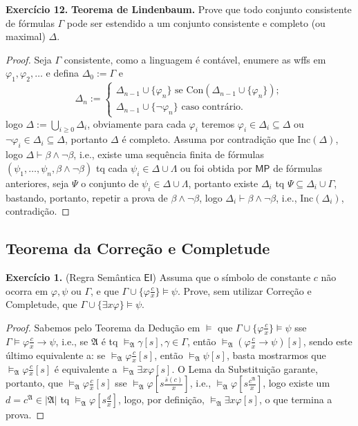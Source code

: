 \documentclass[11pt]{article}
\newcommand{\mf}[1]{\mathfrak{#1}}
\newcommand{\msf}[1]{\mathsf{#1}}
\newcommand{\subs}[2]{
    \setcounter{subsection}{#1 - 1}
    \subsection{#2}
    }
\begin{document}
\begin{shaded}
\textbf{Exercício 12.} \textbf{Teorema de Lindenbaum.} Prove que todo conjunto consistente de fórmulas $\Gamma$ pode ser estendido a um conjunto consistente e completo (ou maximal) $\Delta$. 
\end{shaded}

\begin{proof}
    Seja $\Gamma$ consistente, como a linguagem é contável, enumere as wffs em $\varphi_1,\varphi_2,\dots$ e defina $\Delta_0:=\Gamma$ e
    $$\Delta_n:=\begin{cases}
        \Delta_{n-1}\cup\{\varphi_n\}\text{ se }\text{Con}(\Delta_{n-1}\cup\{\varphi_n\});\\
        \Delta_{n-1}\cup\{\neg\varphi_n\}\text{ caso contrário.}
    \end{cases}$$
    logo $\Delta:=\bigcup_{i\geq0}\Delta_i$, obviamente para cada $\varphi_i$ teremos $\varphi_i\in\Delta_i\subseteq\Delta$ ou $\neg\varphi_i\in\Delta_i\subseteq\Delta$, portanto $\Delta$ é completo. Assuma por contradição que $\text{Inc}(\Delta)$, logo $\Delta\vdash\beta\wedge\neg\beta$, i.e., existe uma sequência finita de fórmulas $(\psi_1,\dots,\psi_n,\beta\wedge\neg\beta)$ tq cada $\psi_i\in\Delta\cup\Lambda$ ou foi obtida por $\msf{MP}$ de fórmulas anteriores, seja $\Psi$ o conjunto de $\psi_i\in\Delta\cup\Lambda$, portanto existe $\Delta_i$ tq $\Psi\subseteq\Delta_i\cup\Gamma$, bastando, portanto, repetir a prova de $\beta\wedge\neg\beta$, logo $\Delta_i\vdash\beta\wedge\neg\beta$, i.e., $\text{Inc}(\Delta_i)$, contradição.
\end{proof}

\subs{5}{Teorema da Correção e Completude}

\begin{shaded}
\textbf{Exercício 1.} (Regra Semântica $\msf{EI}$) Assuma que o símbolo de constante $c$ não ocorra em $\varphi,\psi$ ou $\Gamma$, e que $\Gamma\cup\{\varphi\tfrac{c}{x}\}\vDash\psi$. Prove, sem utilizar Correção e Completude, que $\Gamma\cup\{\exists x\varphi\}\vDash\psi$.
\end{shaded}

\begin{proof}
    Sabemos pelo Teorema da Dedução em $\vDash$ que $\Gamma\cup\{\varphi\tfrac{c}{x}\}\vDash\psi$ sse $\Gamma\vDash\varphi\tfrac{c}{x}\to\psi$, i.e., se $\mf{A}$ é tq $\vDash_\mf{A}\gamma[s],\gamma\in\Gamma$, então $\vDash_\mf{A}(\varphi\tfrac{c}{x}\to\psi)[s]$, sendo este último equivalente a: se $\vDash_\mf{A}\varphi\tfrac{c}{x}[s]$, então $\vDash_\mf{A}\psi[s]$, basta mostrarmos que $\vDash_\mf{A}\varphi\tfrac{c}{x}[s]$ é equivalente a $\vDash_\mf{A}\exists x\varphi[s]$. O Lema da Substituição garante, portanto, que $\vDash_\mf{A}\varphi\tfrac{c}{x}[s]$ sse $\vDash_\mf{A}\varphi\left[s\tfrac{\overline{s}(c)}{x}\right]$, i.e., $\vDash_\mf{A}\varphi\left[s\tfrac{c^\mf{A}}{x}\right]$, logo existe um $d=c^\mf{A}\in|\mf{A}|$ tq $\vDash_\mf{A}\varphi\left[s\tfrac{d}{x}\right]$, logo, por definição, $\vDash_\mf{A}\exists x\varphi[s]$, o que termina a prova.
\end{proof}
\end{document}
